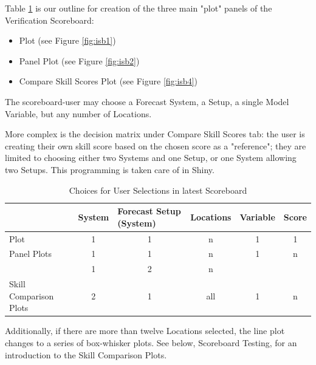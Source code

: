 \documentclass[logos,parttoc,morelanguage=french,morelanguage=german]{orsay-memoire}
\begin{document}
Table \ref{tbl:selectOptions2} is our outline for creation of the three main "plot" panels of the Verification Scoreboard: 
\begin{itemize}
\item Plot (see Figure \ref{fig:isb1})
\item Panel Plot (see Figure \ref{fig:isb2})
\item Compare Skill Scores Plot  (see Figure \ref{fig:isb4})
\end{itemize}

The \gls{scoreboard-user} may choose a Forecast System, a Setup, a single Model Variable, but any number of Locations.

More complex is the decision matrix under Compare Skill Scores tab: the user is creating their own skill score based on the chosen score as a "reference"; they are limited to choosing either two Systems and one Setup, or one System allowing two Setups. This programming is taken care of in Shiny.

\begin{table}[h]
\centering
\begin{tabular}{@{}lccccc@{}}
\toprule
 & \multicolumn{1}{l}{System} & \multicolumn{1}{l}{Forecast Setup (System)} & \multicolumn{1}{l}{Locations} & \multicolumn{1}{l}{Variable} & \multicolumn{1}{l}{Score} \\ \midrule
Plot & \cellcolor[HTML]{FFFFFF}1 & \cellcolor[HTML]{FFFFFF}1 & \cellcolor[HTML]{FFFFFF}n & \cellcolor[HTML]{FFFFFF}1 & \cellcolor[HTML]{FFFFFF}1 \\
Panel Plots & \cellcolor[HTML]{FFFFFF}1 & \cellcolor[HTML]{FFFFFF}1 & \cellcolor[HTML]{FFFFFF}n & \cellcolor[HTML]{FFFFFF}1 & \cellcolor[HTML]{FFFFFF}n \\
 & \cellcolor[HTML]{FFFFFF}1 & \cellcolor[HTML]{CBCEFB}2 & \cellcolor[HTML]{FFFFFF}n & \cellcolor[HTML]{FFFFFF} & \cellcolor[HTML]{FFFFFF} \\
\multirow{-2}{*}{Skill Comparison Plots} & \cellcolor[HTML]{CBCEFB}2 & \cellcolor[HTML]{FFFFFF}1 & \cellcolor[HTML]{CBCEFB}all & \multirow{-2}{*}{\cellcolor[HTML]{FFFFFF}1} & \multirow{-2}{*}{\cellcolor[HTML]{FFFFFF}n} \\ \cmidrule(lr){2-4}
\end{tabular}
\caption{Choices for User Selections in latest Scoreboard}
\label{tbl:selectOptions2}
\end{table}

Additionally, if there are more than twelve Locations selected, the line plot changes to a series of box-whisker plots. See below, Scoreboard Testing, for an introduction to the Skill Comparison Plots.
\end{document}
